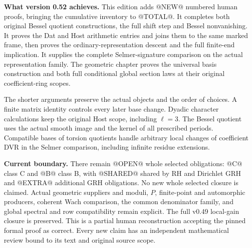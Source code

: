 \textbf{What version 0.52 achieves.}
This edition adds @NEW@ numbered human proofs, bringing the cumulative
inventory to @TOTAL@. It completes both original Bessel quotient
constructions, the full shift step and Bessel nonvanishing. It proves
the Dat and Host arithmetic entries and joins them to the same marked
frame, then proves the ordinary-representation descent and the full
finite-end implication. It supplies the complete Selmer-signature
comparison on the actual representation family. The geometric chapter
proves the universal basis construction and both full conditional
global section laws at their original coefficient-ring scopes.

The shorter arguments preserve the actual objects and the order of
choices. A finite matrix identity controls every later base change.
Dyadic character calculations keep the original Host scope, including
$\ell=3$. The Bessel quotient uses the actual smooth image and the
kernel of all prescribed periods. Compatible bases of torsion
quotients handle arbitrary local changes of coefficient DVR in the
Selmer comparison, including infinite residue extensions.

\textbf{Current boundary.}
There remain @OPEN@ whole selected obligations: @C@ class C and @B@
class B, with @SHARED@ shared by RH and Dirichlet GRH and @EXTRA@
additional GRH obligations. No new whole selected closure is claimed.
Actual geometric suppliers and moduli, $P$, finite-point and automorphic
producers, coherent Wach comparison, the common denominator family,
and global spectral and row compatibility remain explicit. The full
v0.49 local-gain closure is preserved. This is a partial human
reconstruction accepting the pinned formal proof as correct. Every
new claim has an independent mathematical review bound to its text
and original source scope.
